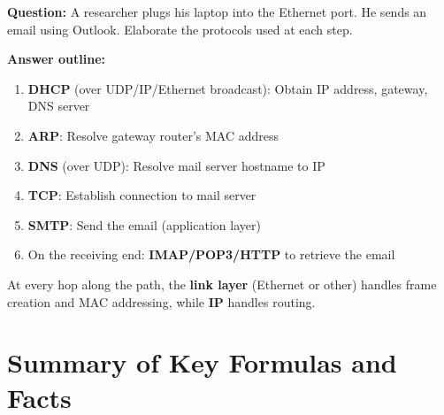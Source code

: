 \begin{exambox}
\textbf{Question:} A researcher plugs his laptop into the Ethernet port. He sends an email using Outlook. Elaborate the protocols used at each step.

\textbf{Answer outline:}
\begin{enumerate}[noitemsep]
    \item \textbf{DHCP} (over UDP/IP/Ethernet broadcast): Obtain IP address, gateway, DNS server
    \item \textbf{ARP}: Resolve gateway router's MAC address
    \item \textbf{DNS} (over UDP): Resolve mail server hostname to IP
    \item \textbf{TCP}: Establish connection to mail server
    \item \textbf{SMTP}: Send the email (application layer)
    \item On the receiving end: \textbf{IMAP/POP3/HTTP} to retrieve the email
\end{enumerate}

At every hop along the path, the \textbf{link layer} (Ethernet or other) handles frame creation and MAC addressing, while \textbf{IP} handles routing.
\end{exambox}

\section{Summary of Key Formulas and Facts}

